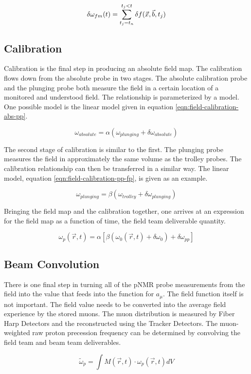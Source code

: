 \begin{equation}
\label{eqn:field-interpolation-fm}
\delta \omega_{fm}(t) \\
= \sum_{t_j = t_n}^{t_j < t} \delta f(\vec{x}, \vec{b}, t_j)
\end{equation}

\subsection{Calibration}

Calibration is the final step in producing an absolute field map.  The calibration flows down from the absolute probe in two stages.  The absolute calibration probe and the plunging probe both measure the field in a certain location of a monitored and understood field.  The relationship is parameterized by a model.  One possible model is the linear model given in equation \ref{eqn:field-calibration-abs-pp}.

\begin{equation}
\label{eqn:field-calibration-abs-pp}
\omega_{absolute} = \alpha(\omega_{plunging} + \delta \omega_{absolute})
\end{equation}

The second stage of calibration is similar to the first.  The plunging probe measures the field in approximately the same volume as the trolley probes.  The calibration relationship can then be transferred in a similar way.  The linear model, equation \ref{eqn:field-calibration-pp-fp}, is given as an example.

\begin{equation}
\label{eqn:field-calibration-pp-fp}
\omega_{plunging} = \beta(\omega_{trolley} + \delta \omega_{plunging})
\end{equation}

Bringing the field map and the calibration together, one arrives at an expression for the field map as a function of time, the field team deliverable quantity.

\begin{equation}
\label{eqn:field-omega-p}
\omega_p(\vec{r}, t) = \alpha 
\left[ 
\beta (\omega_0(\vec{r}, t) + \delta \omega_0) + \delta \omega_{pp}
\right]
\end{equation}

\subsection{Beam Convolution}

There is one final step in turning all of the pNMR probe measurements from the field into the value that feeds into the function for $a_\mu$.  The field function itself is not important.  The field value needs to be converted into the average field experience by the stored muons.  The muon distribution is measured by Fiber Harp Detectors and the reconstructed using the Tracker Detectors\cite{e989-tdr}.  The muon-weighted raw proton precession frequency can be determined by convolving the field team and beam team deliverables.

\begin{equation}
\label{eqn:field-omega-p-tilde}
\tilde{\omega}_p = \int M(\vec{r}, t) \cdot \omega_p(\vec{r}, t) dV
\end{equation}
